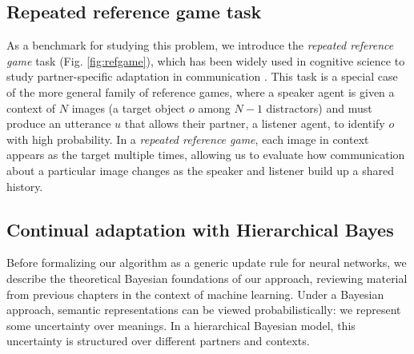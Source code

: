 \subsection{Repeated reference game task}
As a benchmark for studying this problem, we introduce the \emph{repeated reference game} task (Fig. \ref{fig:refgame}), which has been widely used in cognitive science to study partner-specific adaptation in communication \cite{KraussWeinheimer64_ReferencePhrases,ClarkWilkesGibbs86_ReferringCollaborative,WilkesGibbsClark92_CoordinatingBeliefs}.
This task is a special case of the more general family of reference games, where a speaker agent is given a context of $N$ images (a target object $o$ among $N-1$ distractors) and must produce an utterance $u$ that allows their partner, a listener agent, to identify $o$ with high probability. 
In a \emph{repeated reference game}, each image in context appears as the target multiple times, allowing us to evaluate how communication about a particular image changes as the speaker and listener build up a shared history. 

\subsection{Continual adaptation with Hierarchical Bayes}
Before formalizing our algorithm as a generic update rule for neural networks, we describe the theoretical Bayesian foundations of our approach, reviewing material from previous chapters in the context of machine learning.
Under a Bayesian approach, semantic representations can be viewed probabilistically: we represent some uncertainty over meanings.
In a hierarchical Bayesian model, this uncertainty is structured over different partners and contexts.

